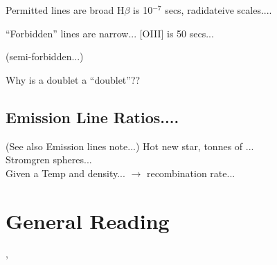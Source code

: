 \documentclass[11pt,a4paper]{article}
\begin{document}
\noindent
Permitted lines are broad
H$\beta$ is 10$^{-7}$ secs, radidateive scales....

\noindent
``Forbidden'' lines are narrow...
[OIII]  is 50 secs...

\noindent
(semi-forbidden...)

\noindent
Why is a doublet a ``doublet''??

\noindent


    \subsection{Emission Line Ratios....}
    (See also Emission lines note...)
    Hot new star, tonnes of \oiii...\\
    Stromgren spheres...\\
    Given a Temp and density... $\rightarrow$ recombination rate...



\citet{Kishimoto08}



\section{General Reading}
\citet{Collin_Souffrin86},  
\citet{Gaskell82}
\citet{Gaskell09}
\citet{Goad15}
\citet{Goad93}
\citet{Korista00}
\citet{Korista04}
\citet{Peterson06_chapter}      
\citet{Peterson08}
\citet{Cackett15}     



\end{document}
